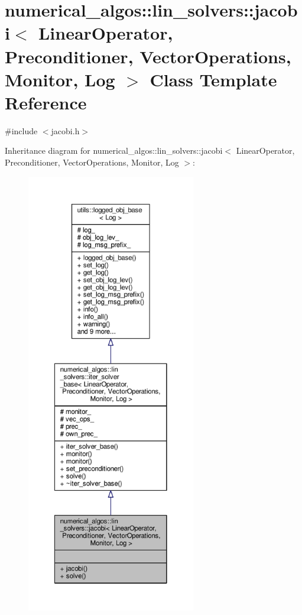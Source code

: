 \hypertarget{classnumerical__algos_1_1lin__solvers_1_1jacobi}{\section{numerical\-\_\-algos\-:\-:lin\-\_\-solvers\-:\-:jacobi$<$ Linear\-Operator, Preconditioner, Vector\-Operations, Monitor, Log $>$ Class Template Reference}
\label{classnumerical__algos_1_1lin__solvers_1_1jacobi}
}


{\ttfamily \#include $<$jacobi.\-h$>$}



Inheritance diagram for numerical\-\_\-algos\-:\-:lin\-\_\-solvers\-:\-:jacobi$<$ Linear\-Operator, Preconditioner, Vector\-Operations, Monitor, Log $>$\-:
\nopagebreak
\begin{figure}[H]
\begin{center}
\leavevmode
\includegraphics[height=550pt]{classnumerical__algos_1_1lin__solvers_1_1jacobi__inherit__graph}
\end{center}
\end{figure}


